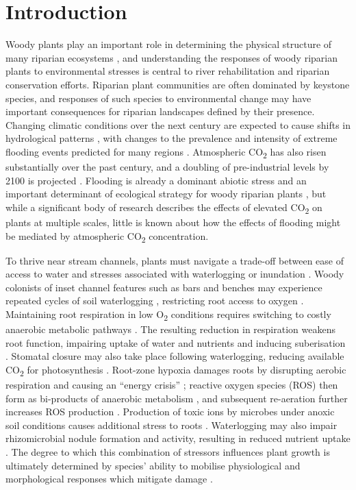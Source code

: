 \documentclass[12pt,a4paper]{memoir}
\begin{document}
\clearpage

\section{Introduction}
Woody plants play an important role in determining the physical structure of many riparian ecosystems \citep{Lawson2015}, and understanding the responses of woody riparian plants to environmental stresses is central to river rehabilitation and riparian conservation efforts. Riparian plant communities are often dominated by keystone species, and responses of such species to environmental change may have important consequences for riparian landscapes defined by their presence. Changing climatic conditions over the next century are expected to cause shifts in hydrological patterns \citep{stocker2013climate}, with changes to the prevalence and intensity of extreme flooding events predicted for many regions \citep{Hennessy2008}. Atmospheric CO\textsubscript{2} has also risen substantially over the past century, and a doubling of pre-industrial levels by 2100 is projected \citep{IPCC2014}. Flooding is already a dominant abiotic stress and an important determinant of ecological strategy for woody riparian plants \citep{Blom1996, Lawson2015}, but while a significant body of research describes the effects of elevated CO\textsubscript{2} on plants at multiple scales, little is known about how the effects of flooding might be mediated by atmospheric CO\textsubscript{2} concentration.

To thrive near stream channels, plants must navigate a trade-off between ease of access to water and stresses associated with waterlogging or inundation \citep{Naiman1993, Colmer2009}. Woody colonists of inset channel features such as bars and benches may experience repeated cycles of soil waterlogging \citep{Corenblit2009}, restricting root access to oxygen \citep{Voesenek2015}. Maintaining root respiration in low O\textsubscript{2} conditions requires switching to costly anaerobic metabolic pathways \citep{Drew1997}. The resulting reduction in respiration weakens root function, impairing uptake of water and nutrients \citep{Piedade2010, Voesenek2015} and inducing suberisation \citep{Steudle2000}. Stomatal closure may also take place following waterlogging, reducing available CO\textsubscript{2} for photosynthesis \citep{Kozlowski1984, Else2009}. Root-zone hypoxia damages roots by disrupting aerobic respiration and causing an “energy crisis” \citep{Colmer2009}; reactive oxygen species (ROS) then form as bi-products of anaerobic metabolism \citep{Santosa2007}, and  subsequent re-aeration further increases ROS production \citep{Steffens2013}. Production of toxic ions by microbes under anoxic soil conditions causes additional stress to roots \citep{Blom1996}. Waterlogging may also impair rhizomicrobial nodule formation and activity, resulting in reduced nutrient uptake \citep{Dawson1989, Shimono2012}. The degree to which this combination of stressors influences plant growth is ultimately determined by species’ ability to mobilise physiological and morphological responses which mitigate damage \cite{Bailey-Serres2008}.
  
\end{document}
